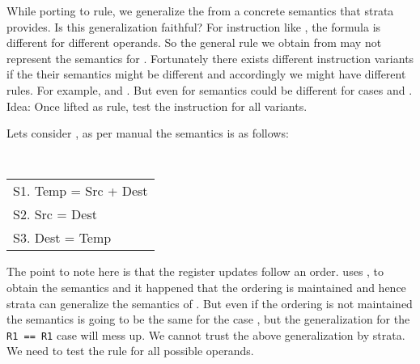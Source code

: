 \begin{itemize}
While porting to \K rule, we generalize the from a concrete semantics that
strata provides. Is this generalization faithful? For instruction like
, the formula is different for different
operands. So the general \K rule we obtain from  may not
represent the semantics for . Fortunately there exists
different instruction variants if the their semantics might be different and
accordingly we might have different \K rules. For example,
             and . But even for
             semantics could be different for cases
             and . Idea: Once lifted as \K
            rule, test the instruction for all variants.  
            
\end{itemize}

Lets consider , as per manual the semantics is
as follows:

{\small \tt 
  \begin{tabular}[b]{l}
   S1. Temp = Src + Dest \\ 
   S2. Src  = Dest \\
   S3. Dest = Temp \\
  \end{tabular}
}


The point to note here is that the register updates follow an order.  \Strata
uses , to obtain the semantics and it happened that
the ordering is maintained and hence strata can generalize the semantics of
. But even if the ordering is not maintained the
semantics is going to be the same for the case , but the generalization
for the \texttt{R1\ ==\ R1} case will mess up.  We cannot trust the above
generalization by strata. We need to test the \K rule for all possible operands.

